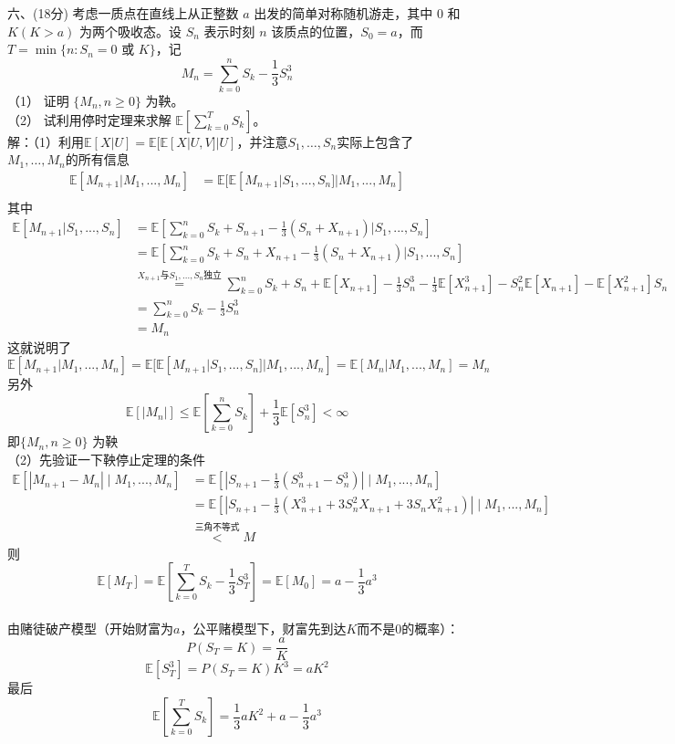 \documentclass[UTF8,openany]{book}
\begin{document}
\noindent 六、(18分) 考虑一质点在直线上从正整数 $a$ 出发的简单对称随机游走，其中 $0$ 和 $K(K > a)$ 为两个吸收态。设 $S_n$ 表示时刻 $n$ 该质点的位置，$S_0 = a$，而 $T = \min\{n : S_n = 0 \text{ 或 } K\}$，记
\[
M_n = \sum_{k=0}^n S_k - \frac{1}{3} S_n^3
\]
（1） 证明 $\{M_n, n \geq 0\}$ 为鞅。\\
（2） 试利用停时定理来求解 $\mathbb{E}[\sum_{k=0}^TS_k]$。\\
解：（1）利用$\mathbb{E}[X|U]=\mathbb{E}[\mathbb{E}[X|U,V]|U]$，并注意$S_1,\dots,S_n$实际上包含了$M_1,\dots,M_n$的所有信息\\
$$
\begin{aligned}
	\mathbb{E}[M_{n+1}|M_1,...,M_n] &= \mathbb{E}[\mathbb{E}[M_{n+1}|S_1,...,S_n]|M_1,...,M_n] \\
\end{aligned}
$$
其中
$$
\begin{aligned}
	\mathbb{E}[M_{n+1}|S_1,...,S_n] & =\mathbb{E}\left[\sum\limits_{k=0}^{n} S_k +S_{n+1}-\frac{1}{3}\left( S_n+X_{n+1}\right) |S_1,...,S_n\right] \\
	&=\mathbb{E}\left[\sum\limits_{k=0}^{n} S_k +S_{n}+X_{n+1}-\frac{1}{3}\left( S_n+X_{n+1}\right)|S_1,...,S_n \right]\\
	& \stackrel{X_{n+1}\text{与}S_1,...,S_n\text{独立}}=\sum\limits_{k=0}^{n} S_k+S_n+\mathbb{E}[X_{n+1}]-\frac{1}{3}S_n^3-\frac{1}{3}\mathbb{E}[X_{n+1}^3]-S_n^2\mathbb{E}[X_{n+1}]-\mathbb{E}[X_{n+1}^2]S_n\\
	&=\sum_{k=0}^n S_k - \frac{1}{3} S_n^3\\
	&=M_n
\end{aligned}
$$
这就说明了
\[
\mathbb{E}[M_{n+1}|M_1,...,M_n]=\mathbb{E}[\mathbb{E}[M_{n+1}|S_1,...,S_n]|M_1,...,M_n]=\mathbb{E}[M_n|M_1,...,M_n]=M_n
\]
另外
\[
\mathbb{E}[|M_n|]\le \mathbb{E}\left[\sum_{k=0}^n S_k  \right] +\frac{1}{3}\mathbb{E}[S_n^3] < \infty
\]
即$\{M_n, n \geq 0\}$ 为鞅\\
（2）先验证一下鞅停止定理的条件
$$
\begin{aligned}
	\mathbb{E}[|M_{n+1}-M_n|\mid M_1,...,M_n] & =\mathbb{E}\left[|S_{n+1}-\frac{1}{3}(S_{n+1}^3-S_n^3)|\mid M_1,...,M_n\right] \\
	&   =\mathbb{E}\left[|S_{n+1}-\frac{1}{3}(X_{n+1}^3+3S_n^2X_{n+1}+3S_nX_{n+1}^2)|\mid M_1,...,M_n\right] \\
	&\stackrel{\text{三角不等式}}<M
\end{aligned}
$$
则$$\mathbb{E}[M_T]=\mathbb{E}\left[ \sum_{k=0}^T S_k - \frac{1}{3} S_T^3\right] =\mathbb{E}[M_0]=a-\frac{1}{3}a^3$$\\
由赌徒破产模型（开始财富为$a$，公平赌模型下，财富先到达$K$而不是0的概率）：
\[
P(S_T=K)=\frac{a}{K}
\]
\[
\mathbb{E}\left[S_T^3 \right] =P(S_T=K)K^3=aK^2
\]
最后
\[
\mathbb{E}\left[ \sum_{k=0}^TS_k\right] =\frac{1}{3}aK^2+a-\frac{1}{3}a^3
\]\\
\end{document}
